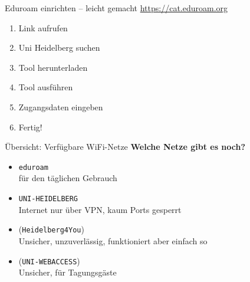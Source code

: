 \begin{frame}{Eduroam einrichten -- leicht gemacht}
    \large \url{https://cat.eduroam.org} \\
    \begin{minipage}[t]{0.515\textwidth}
        \begin{enumerate}
            \item<+-> Link aufrufen
            \item<+-> \glqq{}Uni Heidelberg\grqq{} suchen
            \item<+-> Tool herunterladen
            \item<+-> Tool ausführen
            \item<+-> Zugangsdaten eingeben
            \item<+-> Fertig!
        \end{enumerate}
    \end{minipage}
    \begin{minipage}[t]{0.4\textwidth}
        \vspace{0cm}
        \begin{center}
        \end{center}
    \end{minipage}
\end{frame}


\begin{frame}{Übersicht: Verfügbare WiFi-Netze}
    \large \textbf{Welche Netze gibt es noch?}
    \normalsize
    \begin{itemize}[<+->]
        \item \texttt{eduroam} \\
            für den täglichen Gebrauch
        \item \texttt{UNI-HEIDELBERG} \\
            Internet nur über VPN, kaum Ports gesperrt
        \item {\color{gray}(\texttt{Heidelberg4You})} \\
            Unsicher, unzuverlässig, funktioniert aber einfach so
        \item {\color{gray}(\texttt{UNI-WEBACCESS})} \\
            Unsicher, für Tagungsgäste
    \end{itemize}
\end{frame}


